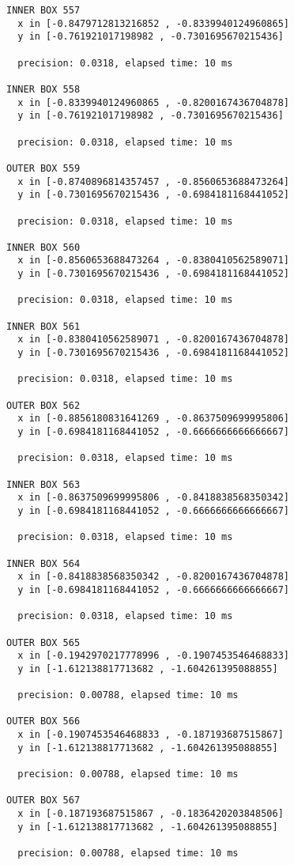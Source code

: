 \begin{verbatim}
INNER BOX 557
  x in [-0.8479712813216852 , -0.8339940124960865]
  y in [-0.761921017198982 , -0.7301695670215436]

  precision: 0.0318, elapsed time: 10 ms

INNER BOX 558
  x in [-0.8339940124960865 , -0.8200167436704878]
  y in [-0.761921017198982 , -0.7301695670215436]

  precision: 0.0318, elapsed time: 10 ms

OUTER BOX 559
  x in [-0.8740896814357457 , -0.8560653688473264]
  y in [-0.7301695670215436 , -0.6984181168441052]

  precision: 0.0318, elapsed time: 10 ms

INNER BOX 560
  x in [-0.8560653688473264 , -0.8380410562589071]
  y in [-0.7301695670215436 , -0.6984181168441052]

  precision: 0.0318, elapsed time: 10 ms

INNER BOX 561
  x in [-0.8380410562589071 , -0.8200167436704878]
  y in [-0.7301695670215436 , -0.6984181168441052]

  precision: 0.0318, elapsed time: 10 ms

OUTER BOX 562
  x in [-0.8856180831641269 , -0.8637509699995806]
  y in [-0.6984181168441052 , -0.6666666666666667]

  precision: 0.0318, elapsed time: 10 ms

INNER BOX 563
  x in [-0.8637509699995806 , -0.8418838568350342]
  y in [-0.6984181168441052 , -0.6666666666666667]

  precision: 0.0318, elapsed time: 10 ms

INNER BOX 564
  x in [-0.8418838568350342 , -0.8200167436704878]
  y in [-0.6984181168441052 , -0.6666666666666667]

  precision: 0.0318, elapsed time: 10 ms

OUTER BOX 565
  x in [-0.1942970217778996 , -0.1907453546468833]
  y in [-1.612138817713682 , -1.604261395088855]

  precision: 0.00788, elapsed time: 10 ms

OUTER BOX 566
  x in [-0.1907453546468833 , -0.187193687515867]
  y in [-1.612138817713682 , -1.604261395088855]

  precision: 0.00788, elapsed time: 10 ms

OUTER BOX 567
  x in [-0.187193687515867 , -0.1836420203848506]
  y in [-1.612138817713682 , -1.604261395088855]

  precision: 0.00788, elapsed time: 10 ms


\end{verbatim}
